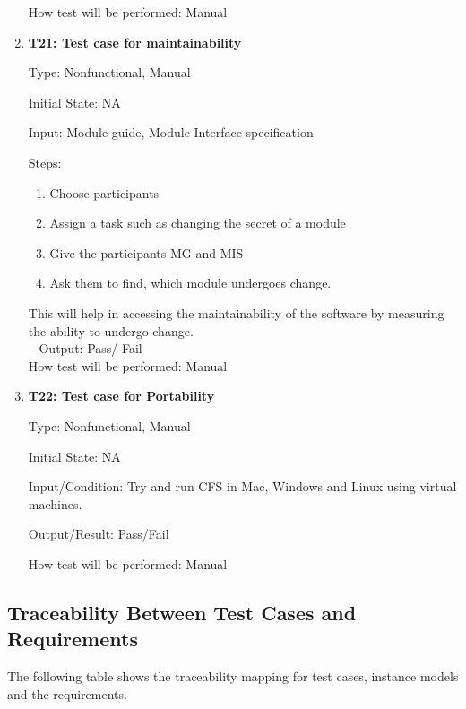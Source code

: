 \documentclass[12pt, titlepage]{article}
\newcommand{\famname}{CFS} %
\begin{document}
\begin{enumerate}
How test will be performed: Manual
				

				
\item{\textbf{T21: Test case for maintainability}\\}

Type: Nonfunctional, Manual
					
Initial State: NA
					
Input: Module guide, Module Interface specification

Steps: 
\begin{enumerate}
	\item Choose participants
	\item Assign a task such as changing the secret of a module
	\item Give the participants MG and MIS
	\item Ask them to find, which module undergoes change.
\end{enumerate}

This will help in accessing the maintainability of the software by measuring the ability to undergo change.\\
~\newline	
Output: Pass/ Fail\\
					
How test will be performed: Manual  



\item{\textbf{T22: Test case for Portability}\\}

Type: Nonfunctional, Manual

Initial State: NA

Input/Condition: Try and run \famname{} in Mac, Windows and Linux using virtual machines.

Output/Result: Pass/Fail

How test will be performed: Manual

\end{enumerate}

\subsection{Traceability Between Test Cases and Requirements}

The following table shows the traceability mapping for test cases, instance models and the requirements. 
\end{document}
